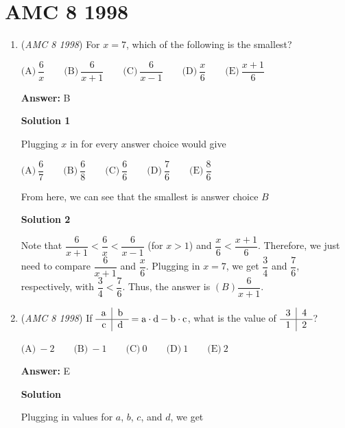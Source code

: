 \section{AMC 8 1998}
        \begin{enumerate}
        	\item (\textit{AMC 8 1998}) For $x=7$, which of the following is the smallest?


 $\text{(A)}\ \dfrac{6}{x} \qquad \text{(B)}\ \dfrac{6}{x+1} \qquad \text{(C)}\ \dfrac{6}{x-1} \qquad \text{(D)}\ \dfrac{x}{6} \qquad \text{(E)}\ \dfrac{x+1}{6}$

 \textbf{Answer: }B



\textbf{Solution 1}

Plugging $x$ in for every answer choice would give

 $\text{(A)}\ \dfrac{6}{7} \qquad \text{(B)}\ \dfrac{6}{8} \qquad \text{(C)}\ \dfrac{6}{6} \qquad \text{(D)}\ \dfrac{7}{6} \qquad \text{(E)}\ \dfrac{8}{6}$

 From here, we can see that the smallest is answer choice $\boxed{B}$




\textbf{Solution 2}

Note that $\dfrac{6}{x+1}<\dfrac{6}{x}<\dfrac{6}{x-1}$ (for $x>1$) and $\dfrac{x}{6}<\dfrac{x+1}{6}$. Therefore, we just need to compare $\dfrac{6}{x+1}$ and $\dfrac{x}{6}$. Plugging in $x=7$, we get $\dfrac{3}{4}$ and $\dfrac{7}{6}$, respectively, with $\dfrac{3}{4}<\dfrac{7}{6}$. Thus, the answer is $\boxed{(B) \dfrac{6}{x+1}}$. 

 


	\item (\textit{AMC 8 1998}) If $\begin{tabular}{r|l}a&b \\ \hline c&d\end{tabular} = \text{a}\cdot \text{d} - \text{b}\cdot \text{c}$, what is the value of $\begin{tabular}{r|l}3&4 \\ \hline 1&2\end{tabular}$?


 $\text{(A)}\ -2 \qquad \text{(B)}\ -1 \qquad \text{(C)}\ 0 \qquad \text{(D)}\ 1 \qquad \text{(E)}\ 2$

 \textbf{Answer: }E



\textbf{Solution}

Plugging in values for $a$, $b$, $c$, and $d$, we get


\end{enumerate}
